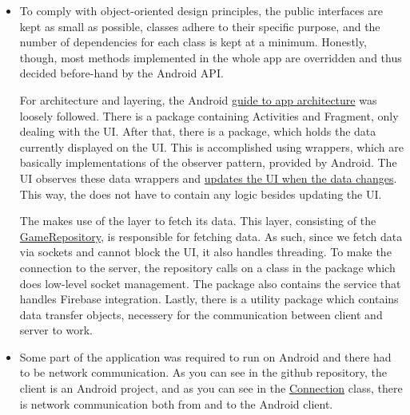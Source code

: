 \documentclass[a4paper]{scrartcl}
\begin{document}
\begin{itemize}
    \item To comply with object-oriented design principles, the public interfaces are kept as small as possible, classes adhere to their specific purpose, and the number of dependencies for each class is kept at a minimum. Honestly, though, most methods implemented in the whole app are overridden and thus decided before-hand by the Android API. 
        
        For architecture and layering, the Android \href{https://developer.android.com/jetpack/docs/guide}{guide to app architecture} was loosely followed. There is a  package containing Activities and Fragment, only dealing with the UI. After that, there is a  package, which holds the data currently displayed on the UI. This is accomplished using  wrappers, which are basically implementations of the observer pattern, provided by Android. The UI observes these data wrappers and \href{https://github.com/fongie/AndroidHangman/blob/master/app/src/main/java/se/kth/korlinge/androidhangman/view/CurrentGameFragment.java#L80}{updates the UI when the data changes}. This way, the  does not have to contain any logic besides updating the UI.

        The  makes use of the  layer to fetch its data. This layer, consisting of the \href{https://github.com/fongie/AndroidHangman/blob/master/app/src/main/java/se/kth/korlinge/androidhangman/repository/GameRepository.java}{GameRepository}, is responsible for fetching data. As such, since we fetch data via sockets and cannot block the UI, it also handles threading. To make the connection to the server, the repository calls on a class  in the  package which does low-level socket management. The  package also contains the service that handles Firebase integration. Lastly, there is a utility package  which contains data transfer objects, necessery for the communication between client and server to work.

    \item Some part of the application was required to run on Android and there had to be network communication. As you can see in the github repository, the client is an Android project, and as you can see in the \href{https://github.com/fongie/AndroidHangman/blob/master/app/src/main/java/se/kth/korlinge/androidhangman/integration/Connection.java}{Connection} class, there is network communication both from and to the Android client.


\end{itemize}
\end{document}
